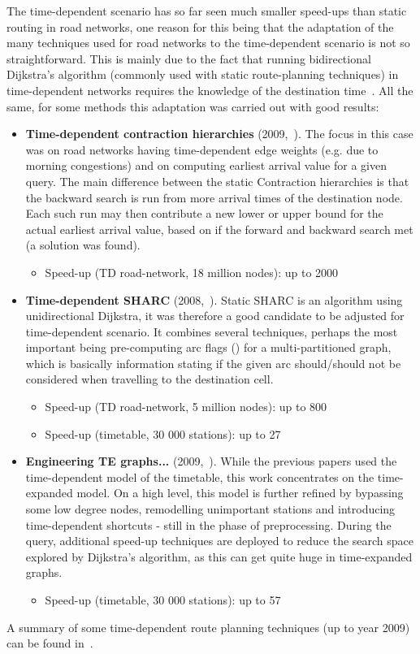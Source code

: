 	The time-dependent scenario has so far seen much smaller speed-ups than static routing in road networks, one reason for this being that the adaptation of the many techniques used for road networks to the time-dependent scenario is not so straightforward. This is mainly due to the fact that running bidirectional Dijkstra's algorithm (commonly used with static route-planning techniques) in time-dependent networks requires the knowledge of the destination time~\cite{engtimeexp09}. All the same, for some methods this adaptation was carried out with good results:
	\begin{itemize}
		\item \textbf{Time-dependent contraction hierarchies} (2009,~\cite{timedepch09}). The focus in this case was on road networks having time-dependent edge weights (e.g. due to morning congestions) and on computing earliest arrival value for a given query. The main difference between the static Contraction hierarchies is that the backward search is run from more arrival times of the destination node. Each such run may then contribute a new lower or upper bound for the actual earliest arrival value, based on if the forward and backward search met (a solution was found).
		\begin{itemize}
			\item Speed-up (TD road-network, 18 million nodes): up to 2000
		\end{itemize}
		\item \textbf{Time-dependent SHARC} (2008,~\cite{sharc08}). Static SHARC is an algorithm using unidirectional Dijkstra, it was therefore a good candidate to be adjusted for time-dependent scenario. It combines several techniques, perhaps the most important being pre-computing arc flags (\cite{arcflags06}) for a multi-partitioned graph, which is basically information stating if the given arc should/should not be considered when travelling to the destination cell.
		\begin{itemize}
			\item Speed-up (TD road-network, 5 million nodes): up to 800
			\item Speed-up (timetable, 30 000 stations): up to 27
		\end{itemize}
		\item \textbf{Engineering TE graphs...} (2009,~\cite{engtimeexp09}). While the previous papers used the time-dependent model of the timetable, this work concentrates on the time-expanded model. On a high level, this model is further refined by bypassing some low degree nodes, remodelling unimportant stations and introducing time-dependent shortcuts - still in the phase of preprocessing. During the query, additional speed-up techniques are deployed to reduce the search space explored by Dijkstra's algorithm, as this can get quite huge in time-expanded graphs.
		\begin{itemize}
			\item Speed-up (timetable, 30 000 stations): up to 57
		\end{itemize}
	\end{itemize}
	\hspace{\fill}
	
	\noindent A summary of some time-dependent route planning techniques (up to year 2009) can be found in~\cite{tdroute09}.